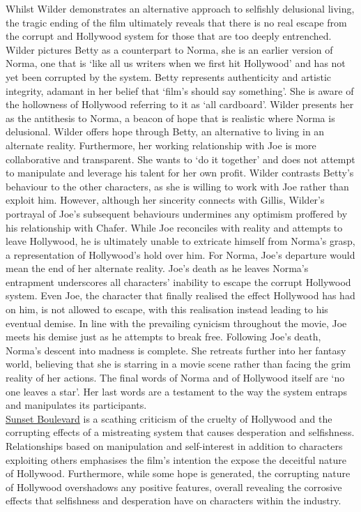 \documentclass[a4paper]{article}
\begin{document}
Whilst Wilder demonstrates an alternative approach to selfishly delusional living, the tragic
ending of the film ultimately reveals that there is no real escape from the corrupt and
Hollywood system for those that are too deeply entrenched. Wilder pictures Betty as a
counterpart to Norma, she is an earlier version of Norma, one that is ‘like all us writers
when we first hit Hollywood’ and has not yet been corrupted by the system. Betty
represents authenticity and artistic integrity, adamant in her belief that ‘film’s should say
something’. She is aware of the hollowness of Hollywood referring to it as ‘all cardboard’.
Wilder presents her as the antithesis to Norma, a beacon of hope that is realistic where
Norma is delusional. Wilder offers hope through Betty, an alternative to living in an
alternate reality. Furthermore, her working relationship with Joe is more collaborative and
transparent. She wants to ‘do it together’ and does not attempt to manipulate and leverage
his talent for her own profit. Wilder contrasts Betty’s behaviour to the other characters, as
she is willing to work with Joe rather than exploit him. However, although her sincerity
connects with Gillis, Wilder’s portrayal of Joe’s subsequent behaviours undermines any
optimism proffered by his relationship with Chafer. While Joe reconciles with reality and
attempts to leave Hollywood, he is ultimately unable to extricate himself from Norma’s
grasp, a representation of Hollywood’s hold over him. For Norma, Joe’s departure would
mean the end of her alternate reality. Joe’s death as he leaves Norma’s entrapment
underscores all characters’ inability to escape the corrupt Hollywood system. Even Joe, the
character that finally realised the effect Hollywood has had on him, is not allowed to escape,
with this realisation instead leading to his eventual demise. In line with the prevailing
cynicism throughout the movie, Joe meets his demise just as he attempts to break free.
Following Joe's death, Norma's descent into madness is complete. She retreats further into
her fantasy world, believing that she is starring in a movie scene rather than facing the grim
reality of her actions. The final words of Norma and of Hollywood itself are ‘no one leaves a
star’. Her last words are a testament to the way the system entraps and manipulates its
participants.\\

\underline{Sunset Boulevard} is a scathing criticism of the cruelty of Hollywood and the corrupting
effects of a mistreating system that causes desperation and selfishness. Relationships based
on manipulation and self-interest in addition to characters exploiting others emphasises the
film’s intention the expose the deceitful nature of Hollywood. Furthermore, while some
hope is generated, the corrupting nature of Hollywood overshadows any positive features,
overall revealing the corrosive effects that selfishness and desperation have on characters
within the industry.\\
\end{document}
